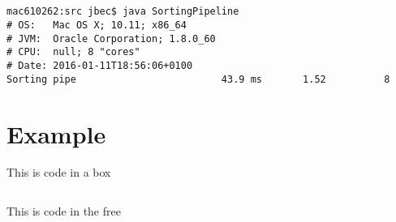 \documentclass{ituhandin}
\begin{document}
\section{} %
\begin{lstlisting}[language={},frame={}]
mac610262:src jbec$ java SortingPipeline
# OS:   Mac OS X; 10.11; x86_64
# JVM:  Oracle Corporation; 1.8.0_60
# CPU:  null; 8 "cores"
# Date: 2016-01-11T18:56:06+0100
Sorting pipe                         43.9 ms       1.52          8
\end{lstlisting}
\section{} %
\chapter{} %
\chapter{} %
\chapter{} %
\chapter{} %

\chapter*{Example}

This is code in a box

\begin{lstlisting}[caption=This is a caption]
\end{lstlisting}


This is code in the free

\begin{lstlisting}[frame={}]
\end{lstlisting}




\label{LastPage}
\end{document}
